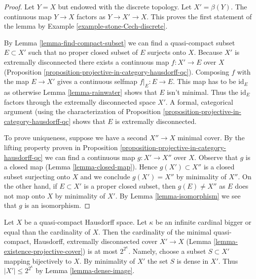 \begin{proof}
Let $Y = X$ but endowed with the discrete topology. Let $X' = \beta(Y)$.
The continuous map $Y \to X$ factors as $Y \to X' \to X$. This
proves the first statement of the lemma by
Example \ref{example-stone-Cech-discrete}.

\medskip\noindent
By Lemma \ref{lemma-find-compact-subset} we can find a quasi-compact subset
$E \subset X'$ such that no proper closed subset of $E$ surjects onto $X$.
Because $X'$ is extremally disconnected there exists a continuous map
$f : X' \to E$ over $X$
(Proposition \ref{proposition-projective-in-category-hausdorff-qc}).
Composing $f$ with the map $E \to X'$ gives a continuous selfmap
$f|_E : E \to E$. This map has to be $\text{id}_E$ as otherwise
Lemma \ref{lemma-rainwater} shows that $E$ isn't minimal.
Thus the $\text{id}_E$ factors through the extremally disconnected
space $X'$. A formal, categorical argument (using the characterization of
Proposition \ref{proposition-projective-in-category-hausdorff-qc}
shows that $E$ is extremally disconnected.

\medskip\noindent
To prove uniqueness, suppose we have a second $X'' \to X$
minimal cover. By the lifting property proven in
Proposition \ref{proposition-projective-in-category-hausdorff-qc}
we can find a continuous map $g : X' \to X''$ over $X$.
Observe that $g$ is a closed map (Lemma \ref{lemma-closed-map}).
Hence $g(X') \subset X''$ is a closed subset surjecting onto $X$
and we conclude $g(X') = X''$ by minimality of $X''$.
On the other hand, if $E \subset X'$ is a proper closed subset,
then $g(E) \not = X''$ as $E$ does not map onto $X$ by minimality
of $X'$. By Lemma \ref{lemma-isomorphism} we see that $g$ is an isomorphism.
\end{proof}

\begin{remark}
\label{remark-size-projective-cover}
Let $X$ be a quasi-compact Hausdorff space. Let $\kappa$ be an infinite
cardinal bigger or equal than the cardinality of $X$. Then the cardinality
of the minimal quasi-compact, Hausdorff, extremally disconnected cover
$X' \to X$ (Lemma \ref{lemma-existence-projective-cover})
is at most $2^{2^\kappa}$. Namely, choose a subset $S \subset X'$
mapping bijectively to $X$. By minimality of $X'$ the set $S$ is dense
in $X'$. Thus $|X'| \leq 2^{2^\kappa}$ by Lemma \ref{lemma-dense-image}.
\end{remark}






